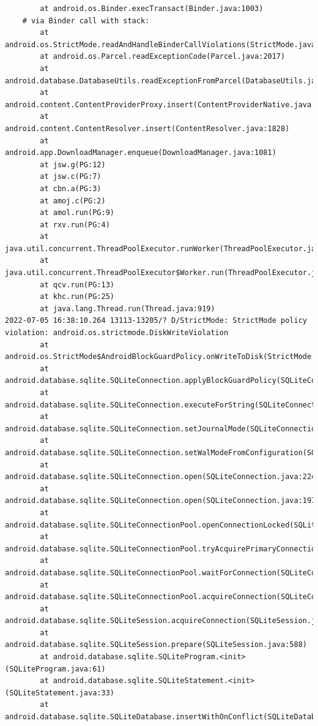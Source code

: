 \documentclass[a4paper,12pt]{book}
\begin{document}
\begin{lstlisting}
        at android.os.Binder.execTransact(Binder.java:1003)
    # via Binder call with stack:
        at android.os.StrictMode.readAndHandleBinderCallViolations(StrictMode.java:2289)
        at android.os.Parcel.readExceptionCode(Parcel.java:2017)
        at android.database.DatabaseUtils.readExceptionFromParcel(DatabaseUtils.java:137)
        at android.content.ContentProviderProxy.insert(ContentProviderNative.java:481)
        at android.content.ContentResolver.insert(ContentResolver.java:1828)
        at android.app.DownloadManager.enqueue(DownloadManager.java:1081)
        at jsw.g(PG:12)
        at jsw.c(PG:7)
        at cbn.a(PG:3)
        at amoj.c(PG:2)
        at amol.run(PG:9)
        at rxv.run(PG:4)
        at java.util.concurrent.ThreadPoolExecutor.runWorker(ThreadPoolExecutor.java:1167)
        at java.util.concurrent.ThreadPoolExecutor$Worker.run(ThreadPoolExecutor.java:641)
        at qcv.run(PG:13)
        at khc.run(PG:25)
        at java.lang.Thread.run(Thread.java:919)
2022-07-05 16:38:10.264 13113-13205/? D/StrictMode: StrictMode policy violation: android.os.strictmode.DiskWriteViolation
        at android.os.StrictMode$AndroidBlockGuardPolicy.onWriteToDisk(StrictMode.java:1527)
        at android.database.sqlite.SQLiteConnection.applyBlockGuardPolicy(SQLiteConnection.java:1140)
        at android.database.sqlite.SQLiteConnection.executeForString(SQLiteConnection.java:733)
        at android.database.sqlite.SQLiteConnection.setJournalMode(SQLiteConnection.java:376)
        at android.database.sqlite.SQLiteConnection.setWalModeFromConfiguration(SQLiteConnection.java:316)
        at android.database.sqlite.SQLiteConnection.open(SQLiteConnection.java:224)
        at android.database.sqlite.SQLiteConnection.open(SQLiteConnection.java:197)
        at android.database.sqlite.SQLiteConnectionPool.openConnectionLocked(SQLiteConnectionPool.java:505)
        at android.database.sqlite.SQLiteConnectionPool.tryAcquirePrimaryConnectionLocked(SQLiteConnectionPool.java:949)
        at android.database.sqlite.SQLiteConnectionPool.waitForConnection(SQLiteConnectionPool.java:699)
        at android.database.sqlite.SQLiteConnectionPool.acquireConnection(SQLiteConnectionPool.java:380)
        at android.database.sqlite.SQLiteSession.acquireConnection(SQLiteSession.java:896)
        at android.database.sqlite.SQLiteSession.prepare(SQLiteSession.java:588)
        at android.database.sqlite.SQLiteProgram.<init>(SQLiteProgram.java:61)
        at android.database.sqlite.SQLiteStatement.<init>(SQLiteStatement.java:33)
        at android.database.sqlite.SQLiteDatabase.insertWithOnConflict(SQLiteDatabase.java:1597)

\end{lstlisting}
\end{document}
